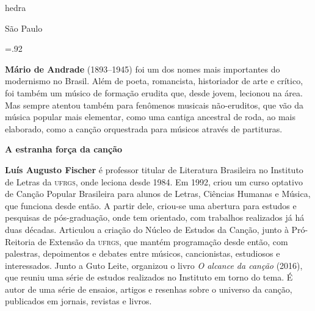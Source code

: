               \newfontfamily{}
              {\fontsize{30}{40}\selectfont \timesnewroman hedra}
              
              \medskip

              {\selectfont\minion\small
              São Paulo \quad\the\year}
\endgroup
\pagebreak

\begingroup 

\footnotesize\parindent0pt\parskip5pt\thispagestyle{empty} 
\vspace*{.1\textheight}\mbox{} \vfill
\baselineskip=.92\baselineskip
\thispagestyle{empty}

\textbf{Mário de Andrade} (1893--1945) foi um dos nomes mais importantes do modernismo no Brasil. Além de poeta, romancista, historiador de arte e crítico, foi também um músico de formação erudita que, desde jovem, lecionou na área. Mas sempre atentou também para fenômenos musicais não-eruditos, que vão da música popular mais elementar, como uma cantiga ancestral de roda, ao mais elaborado, como a canção orquestrada para músicos através de partituras.

\textbf{A estranha força da canção} 

\textbf{Luís Augusto Fischer} é professor titular de Literatura Brasileira no Instituto de Letras da \textsc{ufrgs}, onde leciona desde 1984. Em 1992, criou um curso optativo de Canção Popular Brasileira para alunos de Letras, Ciências Humanas e Música, que funciona desde então. A partir dele, criou-se uma abertura para estudos e pesquisas de pós-graduação, onde tem orientado, com trabalhos realizados já há duas décadas. Articulou a criação do Núcleo de Estudos da Canção, junto à Pró-Reitoria de Extensão da \textsc{ufrgs}, que mantém programação desde então, com palestras, depoimentos e debates entre músicos, cancionistas, estudiosos e interessados. Junto a Guto Leite, organizou o livro \textit{O alcance da canção} (2016), que reuniu uma série de estudos realizados no Instituto em torno do tema. É autor de uma série de ensaios, artigos e resenhas sobre o universo da canção, publicados em jornais, revistas e livros.

\endgroup
\pagebreak
